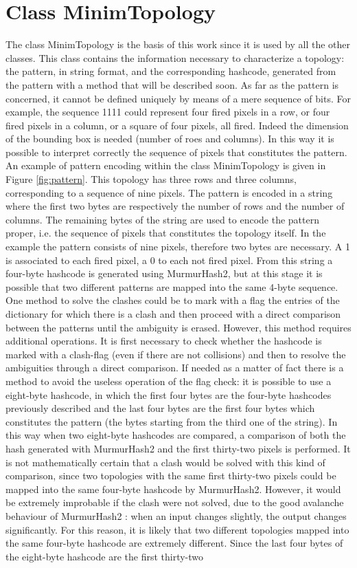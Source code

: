 \section{Class MinimTopology}
\label{sec:minim}
The class MinimTopology is the basis of this work since it is used by all the other classes. This class contains the information necessary to characterize a topology: the pattern, in string format, and the corresponding hashcode, generated from the pattern with a method that will be described soon. As far as the pattern is concerned, it cannot be defined uniquely by means of a mere sequence of bits. For example, the sequence 1111 could represent four fired pixels in a row, or four fired pixels in a column, or a square of four pixels, all fired. Indeed the dimension of the bounding box is needed (number of roes and columns). In this way it is possible to interpret correctly the sequence of pixels that constitutes the pattern. An example of pattern encoding within the class MinimTopology is given in Figure \ref{fig:pattern}. This topology has three rows and three columns, corresponding to a sequence of nine pixels. The pattern is encoded in a string where the first two bytes are respectively the number of rows and the number of columns. The remaining bytes of the string are used to encode the pattern proper, i.e. the sequence of pixels that constitutes the topology itself. In the example the pattern consists of nine pixels, therefore two bytes are necessary. A 1 is associated to each fired pixel, a 0 to each not fired pixel. From this string a four-byte hashcode is generated using MurmurHash2, but at this stage it is possible that two different patterns are mapped into the same 4-byte sequence. One method to solve the clashes could be to mark with a flag the entries of the dictionary for which there is a clash and then proceed with a direct comparison between the patterns until the ambiguity is erased. However, this method requires additional operations. It is first necessary to check whether the hashcode is marked with a clash-flag (even if there are not collisions) and then to resolve the ambiguities through a direct comparison. If needed as a matter of fact there is a method to avoid the useless operation of the flag check: it is possible to use a eight-byte hashcode, in which the first four bytes are the four-byte hashcodes previously described and the last four bytes are the first four bytes which constitutes the pattern (the bytes starting from the third one of the string). In this way when two eight-byte hashcodes are compared, a comparison of both the hash generated with MurmurHash2 and the first thirty-two pixels is performed. It is not mathematically certain that a clash would be solved with this kind of comparison, since two topologies with the same first thirty-two pixels could be mapped into the same four-byte hashcode by MurmurHash2. However, it would be extremely improbable if the clash were not solved, due to the good avalanche behaviour of MurmurHash2 \cite{hash}: when an input changes slightly, the output changes significantly. For this reason, it is likely that two different topologies mapped into the same four-byte hashcode are extremely different. Since the last four bytes of the eight-byte hashcode are the first thirty-two 